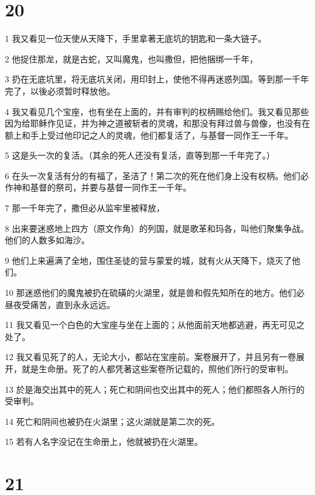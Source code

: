 \chapter{20}

\par 1 我又看见一位天使从天降下，手里拿著无底坑的钥匙和一条大链子。
\par 2 他捉住那龙，就是古蛇，又叫魔鬼，也叫撒但，把他捆绑一千年，
\par 3 扔在无底坑里，将无底坑关闭，用印封上，使他不得再迷惑列国。等到那一千年完了，以後必须暂时释放他。
\par 4 我又看见几个宝座，也有坐在上面的，并有审判的权柄赐给他们。我又看见那些因为给耶稣作见证，并为神之道被斩者的灵魂，和那没有拜过兽与兽像，也没有在额上和手上受过他印记之人的灵魂，他们都复活了，与基督一同作王一千年。
\par 5 这是头一次的复活。（其余的死人还没有复活，直等到那一千年完了。）
\par 6 在头一次复活有分的有福了，圣洁了！第二次的死在他们身上没有权柄。他们必作神和基督的祭司，并要与基督一同作王一千年。
\par 7 那一千年完了，撒但必从监牢里被释放，
\par 8 出来要迷惑地上四方（原文作角）的列国，就是歌革和玛各，叫他们聚集争战。他们的人数多如海沙。
\par 9 他们上来遍满了全地，围住圣徒的营与蒙爱的城，就有火从天降下，烧灭了他们。
\par 10 那迷惑他们的魔鬼被扔在硫磺的火湖里，就是兽和假先知所在的地方。他们必昼夜受痛苦，直到永永远远。
\par 11 我又看见一个白色的大宝座与坐在上面的；从他面前天地都逃避，再无可见之处了。
\par 12 我又看见死了的人，无论大小，都站在宝座前。案卷展开了，并且另有一卷展开，就是生命册。死了的人都凭著这些案卷所记载的，照他们所行的受审判。
\par 13 於是海交出其中的死人；死亡和阴间也交出其中的死人；他们都照各人所行的受审判。
\par 14 死亡和阴间也被扔在火湖里；这火湖就是第二次的死。
\par 15 若有人名字没记在生命册上，他就被扔在火湖里。

\chapter{21}

